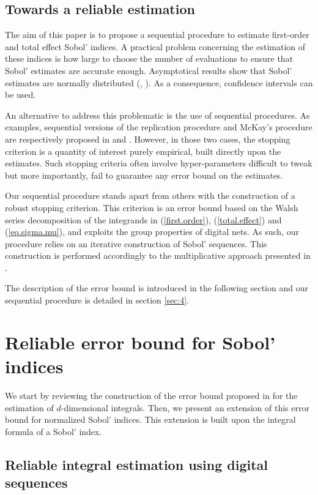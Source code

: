 \subsection{Towards a reliable estimation}
\label{sec:2.3}
The aim of this paper is to propose a sequential procedure to estimate first-order and total effect Sobol' indices.  A practical problem concerning the estimation of these indices is how large to choose the number of evaluations to ensure that Sobol' estimates are accurate enough. Asymptotical results show that Sobol' estimates are normally distributed (\cite[Proposition 2.2]{Janon}, \cite[Proposition 3.5]{Tissot}). As a consequence, confidence intervals can be used.

An alternative to address this problematic is the use of sequential procedures. As examples, sequential versions of the replication procedure and McKay's procedure are respectively proposed in \cite{Gilquin.rec} and \cite{Tong}. However, in those two cases, the stopping criterion is a quantity of interest purely empirical, built directly upon the estimates. Such stopping criteria often involve hyper-parameters difficult to tweak but more importantly, fail to guarantee any error bound on the estimates. 

Our sequential procedure stands apart from others with the construction of a robust stopping criterion. This criterion is an error bound based on the Walsh series decomposition of the integrands in (\ref{first.order}), (\ref{total.effect}) and (\ref{eq.sigma.mu}), and exploits the group properties of digital nets. As such, our procedure relies on an iterative construction of Sobol' sequences. This construction is performed accordingly to the multiplicative approach presented in \cite{GJAHMP}.

The description of the error bound is introduced in the following section and our sequential procedure is detailed in section \ref{sec:4}.


\section{Reliable error bound for Sobol' indices}
\label{sec:3} 
We start by reviewing the construction of the error bound proposed in \cite{HicJim} for the estimation of $d$-dimensional integrals. Then, we present an extension of this error bound for normalized Sobol' indices. This extension is built upon the integral formula of a Sobol' index.

\subsection{Reliable integral estimation using digital sequences}
\label{sec:3.1}

